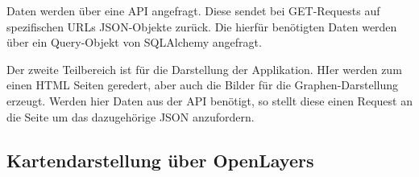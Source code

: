 Daten werden über eine API angefragt. Diese sendet bei GET-Requests auf spezifischen URLs JSON-Objekte zurück. Die hierfür benötigten Daten werden über ein Query-Objekt von SQLAlchemy angefragt.

Der zweite Teilbereich ist für die Darstellung der Applikation. HIer werden zum einen HTML Seiten geredert, aber auch die Bilder für die Graphen-Darstellung erzeugt. Werden hier Daten aus der API benötigt, so stellt diese einen Request an die Seite um das dazugehörige JSON anzufordern.

\subsection{Kartendarstellung über OpenLayers}











